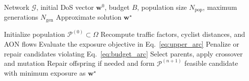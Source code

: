 \documentclass[lettersize,journal]{IEEEtran}
\makeatletter
\newcommand{\algline}[1]{\begin{tabular}[t]{@{}l@{}}#1\end{tabular}}
\makeatother
\begin{document}







\begin{algorithm}[t]
\caption{GA for the original arc-level optimization problem}
\label{alg:ga_original}
\begin{algorithmic}[1]
\Require Network $\mathcal{G}$, initial DoS vector $\mathbf{w}^{0}$, budget $B$,
population size $N_{\mathrm{pop}}$, maximum generations $N_{\mathrm{gen}}$
\Ensure Approximate solution $\mathbf{w}^{\star}$

\State Initialize population $\mathcal{P}^{(0)}\subset\Omega$
        \State Recompute traffic factors, cyclist distances, and AON flows
        \State Evaluate the exposure objective in Eq.~\eqref{eq:upper_arc}
        \State Penalize or repair candidates violating Eq.~\eqref{eq:budget_arc}
    \EndFor
    \State Select parents, apply crossover and mutation
    \State Repair offspring if needed and form $\mathcal{P}^{(n+1)}$
\EndFor
\State \Return feasible candidate with minimum exposure as $\mathbf{w}^{\star}$
\end{algorithmic}
\end{algorithm}
\end{document}
